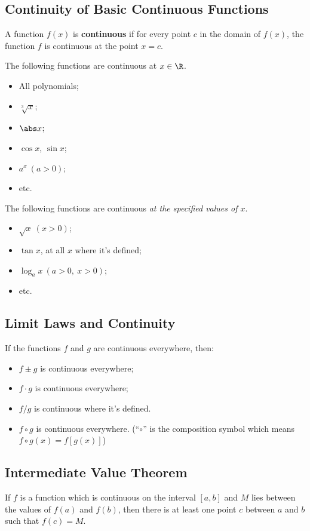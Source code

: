 \subsection{Continuity of Basic Continuous Functions}
\begin{definition}
  A function $f(x)$ is \textbf{continuous} if for every point $c$ in the domain of $f(x)$, the function $f$ is continuous at the point $x=c$.
\end{definition}
The following functions are continuous at $x\in\R$.
\begin{itemize}
\item All polynomials;
\item $\sqrt[3]{x}$;
\item $\abs x$;
\item $\cos x$, $\sin x$;
\item $a^x\ (a>0)$;
\item etc.
\end{itemize}

The following functions are continuous \textit{at the specified values of $x$}.
\begin{itemize}
\item $\sqrt x\ (x>0)$;
\item $\tan x$, at all $x$ where it's defined;
\item $\log_a x\ (a>0,\ x>0)$;
\item etc.
\end{itemize}

\subsection{Limit Laws and Continuity}
If the functions $f$ and $g$ are continuous everywhere, then:
\begin{itemize}
\item $f\pm g$ is continuous everywhere;
\item $f\cdot g$ is continuous everywhere;
\item $f/g$ is continuous where it's defined.
\item $f\circ g$ is continuous everywhere. (``$\circ$'' is the composition symbol which means $f\circ g(x)=f[g(x)]$)
\end{itemize}

\subsection{Intermediate Value Theorem}
If $f$ is a function which is continuous on the interval $\left[a,b\right]$ and $M$ lies between the values of \(f(a)\) and \(f(b)\), then there is at least one point $c$ between $a$ and $b$ such that $f(c)=M$.

